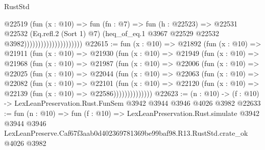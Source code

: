\begin{lexlean}{RustStd}
\begin{coremodule}
                                        @22519
                                          (fun (x : @10) =>
                                          fun (fn : @7) =>
                                          fun (h : @22523) =>
                                          @22531
                                            @22532
                                            (Eq.refl.{2} (Sort 1) @7)
                                            (heq_of_eq.{1}
                                              @3967
                                              @22529
                                              @22532
                                              @3982)))))))))))))))))))))
@22615 := fun (x : @10) =>
  @21892
    (fun (x : @10) =>
    @21911
      (fun (x : @10) =>
      @21930
        (fun (x : @10) =>
        @21949
          (fun (x : @10) =>
          @21968
            (fun (x : @10) =>
            @21987
              (fun (x : @10) =>
              @22006
                (fun (x : @10) =>
                @22025
                  (fun (x : @10) =>
                  @22044
                    (fun (x : @10) =>
                    @22063
                      (fun (x : @10) =>
                      @22082
                        (fun (x : @10) =>
                        @22101
                          (fun (x : @10) =>
                          @22120 (fun (x : @10) => @22139 (fun (x : @10) => @22586))))))))))))))
@22623 := (n : @10) -> (f : @10) -> LexLeanPreservation.Rust.FunSem @3942 @3944 @3946 @4026 @3982
@22633 := fun (n : @10) =>
  fun (f : @10) =>
  LexLeanPreservation.Rust.simulate
    @3942
    @3944
    @3946
    LexLeanPreserve.Caf67f3aab0d402369781369be99baf98.R13.RustStd.crate_ok
    @4026
    @3982
\end{coremodule}
\end{lexlean}
